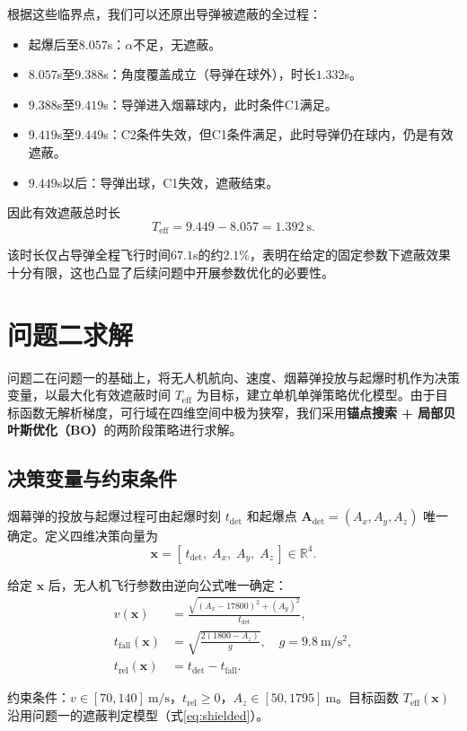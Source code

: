 \documentclass{ctexart}
\begin{document}
根据这些临界点，我们可以还原出导弹被遮蔽的全过程：
\begin{itemize}
    \item 起爆后至$8.057$s：$\alpha$不足，无遮蔽。
    \item $8.057$s至$9.388$s：角度覆盖成立（导弹在球外），时长$1.332$s。
    \item $9.388$s至$9.419$s：导弹进入烟幕球内，此时条件C1满足。
    \item $9.419$s至$9.449$s：C2条件失效，但C1条件满足，此时导弹仍在球内，仍是有效遮蔽。
    \item $9.449$s以后：导弹出球，C1失效，遮蔽结束。
\end{itemize}
因此有效遮蔽总时长
\[
T_{\text{eff}} =9.449-8.057= 1.392\ \mathrm{s}.
\]

该时长仅占导弹全程飞行时间$67.1$s的约$2.1\%$，表明在给定的固定参数下遮蔽效果十分有限，这也凸显了后续问题中开展参数优化的必要性。

\section{问题二求解}
\label{sec:p2}

问题二在问题一的基础上，将无人机航向、速度、烟幕弹投放与起爆时机作为决策变量，以最大化有效遮蔽时间 $T_{\text{eff}}$ 为目标，建立单机单弹策略优化模型。由于目标函数无解析梯度，可行域在四维空间中极为狭窄，我们采用\textbf{锚点搜索 + 局部贝叶斯优化（BO）}的两阶段策略进行求解。

\subsection{决策变量与约束条件}

烟幕弹的投放与起爆过程可由起爆时刻 $t_{\text{det}}$ 和起爆点 $\mathbf{A}_{\text{det}}=(A_x,A_y,A_z)$ 唯一确定。定义四维决策向量为
\[
\mathbf{x} = [\,t_{\text{det}},\; A_x,\; A_y,\; A_z\,] \in \mathbb{R}^4.
\]

给定 $\mathbf{x}$ 后，无人机飞行参数由逆向公式唯一确定：
\begin{align}
v(\mathbf{x}) &= \frac{\sqrt{(A_x - 17800)^2 + (A_y)^2}}{t_{\text{det}}}, \\
t_{\text{fall}}(\mathbf{x}) &= \sqrt{\frac{2(1800 - A_z)}{g}}, \quad g = 9.8\ \mathrm{m/s^2}, \\
t_{\text{rel}}(\mathbf{x}) &= t_{\text{det}} - t_{\text{fall}}.
\end{align}

约束条件：$v \in [70, 140]\ \mathrm{m/s}$，$t_{\text{rel}} \geq 0$，$A_z \in [50, 1795]\ \mathrm{m}$。目标函数 $T_{\text{eff}}(\mathbf{x})$ 沿用问题一的遮蔽判定模型（式\ref{eq:shielded}）。
\end{document}
